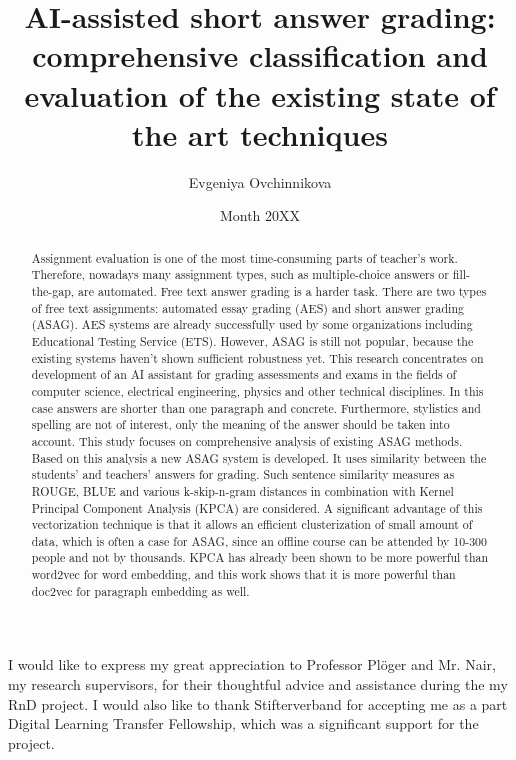 \documentclass[rnd]{mas_report}
\author{Evgeniya Ovchinnikova}
\title{AI-assisted short answer grading: comprehensive classification and evaluation of the existing state of the art techniques}
\date{Month 20XX}
\begin{document}
\begin{titlepage}
    \maketitle
\end{titlepage}


\pagestyle{plain}


\cleardoublepage
\statementpage

\begin{abstract}
Assignment evaluation is one of the most time-consuming parts of teacher's work. Therefore, nowadays many assignment types, such as multiple-choice answers or fill-the-gap, are automated. Free text answer grading is a harder task. There are two types of free text assignments: automated essay grading (AES) and short answer grading (ASAG). AES systems are already successfully used by some organizations including Educational Testing Service (ETS). However, ASAG is still not popular, because the existing systems haven't shown sufficient robustness yet. This research concentrates on development of an AI assistant for grading assessments and exams in the fields of computer science, electrical engineering, physics and other technical disciplines. In this case answers are shorter than one paragraph and concrete. Furthermore, stylistics and spelling are not of interest, only the meaning of the answer should be taken into account. This study focuses on comprehensive analysis of existing ASAG methods. Based on this analysis a new ASAG system is developed. It uses similarity between the students' and teachers' answers for grading. Such sentence similarity measures as ROUGE, BLUE and various k-skip-n-gram distances in combination with Kernel Principal Component Analysis (KPCA) are considered. A significant advantage of this vectorization technique is that it allows an efficient clusterization of small amount of data, which is often a case for ASAG, since an offline course can be attended by 10-300 people and not by thousands. KPCA has already been shown to be more powerful than word2vec for word embedding, and this work shows that it is more powerful than doc2vec for paragraph embedding as well.
\end{abstract}


\begin{acknowledgements}
I would like to express my great appreciation to Professor Pl{\"o}ger and Mr. Nair, my research supervisors, for their thoughtful advice and assistance during the my RnD project. I would also like to thank Stifterverband for accepting me as a part Digital Learning Transfer Fellowship, which was a significant support for the project. 
\end{acknowledgements}
\end{document}
